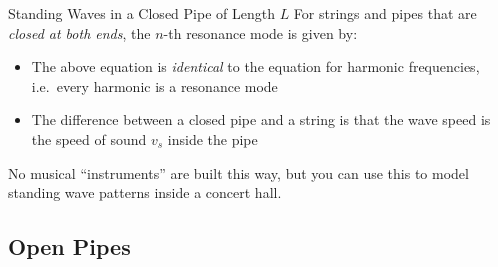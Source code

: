 \documentclass[12pt,compress,aspectratio=169]{beamer}
\begin{document}
\begin{frame}{Standing Waves in a Closed Pipe of Length $L$}
  For strings and pipes that are \emph{closed at both ends}, the $n$-th
  resonance mode is given by:
  
  \begin{itemize}
  \item The above equation is \emph{identical} to the equation for harmonic
    frequencies, i.e.\ every harmonic is a resonance mode
  \item The difference between a closed pipe and a string is that the wave
    speed is the speed of sound $v_s$ inside the pipe
  \end{itemize}
  No musical ``instruments'' are built this way, but you can use this to model
  standing wave patterns inside a concert hall.
\end{frame}



\subsection{Open Pipes}
\end{document}
